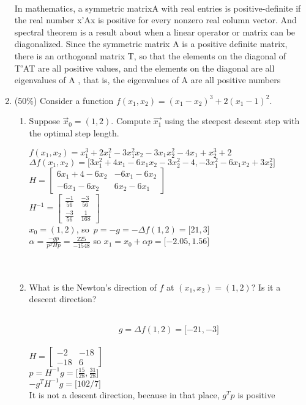 \documentclass[a4paper,10pt]{article}
\begin{document}
\begin{enumerate}
{\color{blue} 
\\
In mathematics, a symmetric matrixA with real entries is positive-definite if the real number  x'Ax is positive for every nonzero real column vector. And spectral theorem is a result about when a linear operator or matrix can be diagonalized. 
Since the symmetric matrix A is a positive definite matrix, there is an orthogonal matrix T, so that the elements on the diagonal of T'AT are all positive values, and the elements on the diagonal are all eigenvalues of A , that is, the eigenvalues of A are all positive numbers

    

}

  \item (50\%) Consider a function $f(x_1,x_2) = (x_1-x_2)^3+2(x_1-1)^2$. 
    \begin{enumerate}
    \item Suppose $\vec{x}_0=(1,2)$. Compute $\vec{x_1}$ using the steepest descent step with the optimal step length.

{\color{blue} $f(x_1,x_2) = x_1^3 + 2x_1^2 - 3x_1^2x_2 - 3x_1x_2^2 - 4x_1 + x_2^3 + 2$\\
$\Delta f(x_1,x_2) = \lbrack 3x_1^2 + 4x_1 - 6x_1x_2 - 3x_2^2 - 4, -3x_1^2 - 6x_1x_2 + 3x_2^2 \rbrack$\\
$H = \begin{bmatrix} 6x_1 + 4 -6x_2 & -6x_1-6x_2 \\ -6x_1-6x_2& 6x_2-6x_1  \end{bmatrix}$\\
$H^{-1} = \begin{bmatrix} \frac{-1}{56}& \frac{-3}{56}\\ \frac{-3}{56}& \frac{1}{168} \end{bmatrix}$\\
$x_0 = (1,2)$, so\ $p = -g = -\Delta f(1,2) = \lbrack 21,3 \rbrack$\\
$\alpha = \frac{-gp}{p^THp} = \frac{225}{-1548}$
so $x_1 = x_0 + \alpha p = \lbrack -2.05,1.56 \rbrack$\\
\\
\\

    

}

    \item What is the Newton's direction of $f$ at $(x_1,x_2)=(1,2)$?  Is it a descent direction?

{\color{blue}
\\ $$g = \Delta f(1,2) = \lbrack -21, -3 \rbrack$$
\\$H= \begin{bmatrix}-2 &-18 \\ -18 & 6\end{bmatrix}$
\\$p = H^{-1}g = \lbrack \frac{15}{28}, \frac{31}{28} \rbrack$
\\$-g^TH^{-1}g = \lbrack 102/7 \rbrack $
\\It is not a descent direction, because in that place, $g^Tp$ is positive

}
\end{enumerate}
\end{enumerate}
\end{document}
